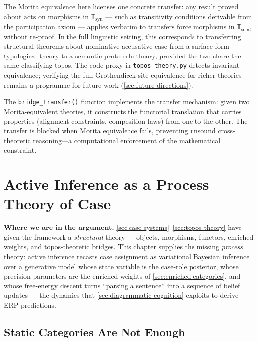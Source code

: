\documentclass[
]{article}
\begin{document}
The Morita equivalence here licenses one concrete transfer: any result
proved about \(\text{acts\_on}\) morphisms in
\(\mathbb{T}_{\text{syn}}\) --- such as transitivity conditions
derivable from the participation axiom --- applies verbatim to
\(\text{transfers\_force}\) morphisms in \(\mathbb{T}_{\text{sem}}\),
without re-proof. In the full linguistic setting, this corresponds to
transferring structural theorems about nominative-accusative case from a
surface-form typological theory to a semantic proto-role theory,
provided the two share the same classifying topos. The code proxy in
\texttt{topos\_theory.py} detects invariant equivalence; verifying the
full Grothendieck-site equivalence for richer theories remains a
programme for future work (\autoref{sec:future-directions}).

The \texttt{bridge\_transfer()} function implements the transfer
mechanism: given two Morita-equivalent theories, it constructs the
functorial translation that carries properties (alignment constraints,
composition laws) from one to the other. The transfer is blocked when
Morita equivalence fails, preventing unsound cross-theoretic
reasoning---a computational enforcement of the mathematical constraint.

\newpage

\section{Active Inference as a Process Theory of
Case}\label{sec:cognitive-integration}

\textbf{Where we are in the argument.}
\autoref{sec:case-systems}--\autoref{sec:topos-theory} have given the
framework a \emph{structural} theory --- objects, morphisms, functors,
enriched weights, and topos-theoretic bridges. This chapter supplies the
missing \emph{process} theory: active inference recasts case assignment
as variational Bayesian inference over a generative model whose state
variable is the case-role posterior, whose precision parameters are the
enriched weights of \autoref{sec:enriched-categories}, and whose
free-energy descent turns ``parsing a sentence'' into a sequence of
belief updates --- the dynamics that
\autoref{sec:diagrammatic-cognition} exploits to derive ERP predictions.

\subsection{Static Categories Are Not
Enough}\label{static-categories-are-not-enough}
\end{document}
